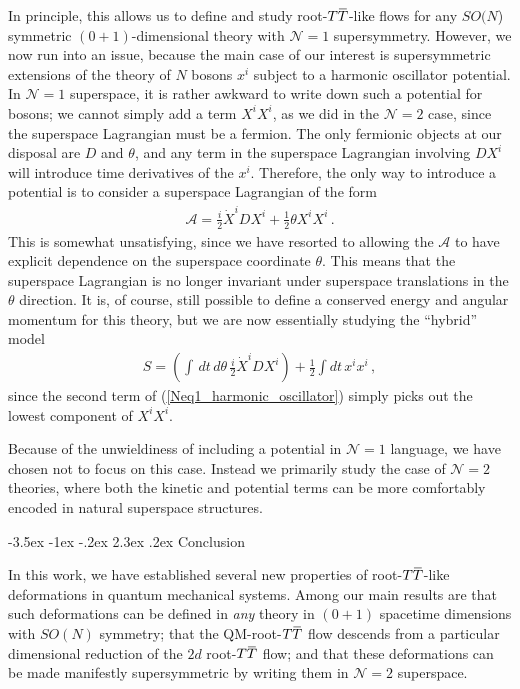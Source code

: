 \documentclass[12pt]{article}
\makeatletter
\numberwithin{equation}{section}
\renewcommand\section{\@startsection {section}{1}{\z@}%
                                   {-3.5ex \@plus -1ex \@minus -.2ex}%
                                   {2.3ex \@plus.2ex}%
                                   {\normalfont\large\bfseries}}
\newcommand{\overbar}[1]{\mkern 1.5mu\overline{\mkern-1.5mu#1\mkern-1.5mu}\mkern 1.5mu}
\def\TT{{T\overbar{T}}}
\makeatother
\begin{document}
In principle, this allows us to define and study root-$\TT$-like flows for any $SO(N$) symmetric $(0+1)$-dimensional theory with $\mathcal{N} = 1$ supersymmetry. However, we now run into an issue, because the main case of our interest is supersymmetric extensions of the theory of $N$ bosons $x^i$ subject to a harmonic oscillator potential. In $\mathcal{N} = 1$ superspace, it is rather awkward to write down such a potential for bosons; we cannot simply add a term $X^i X^i$, as we did in the $\mathcal{N} = 2$ case, since the superspace Lagrangian must be a fermion. The only fermionic objects at our disposal are $D$ and $\theta$, and any term in the superspace Lagrangian involving $D X^i$ will introduce time derivatives of the $x^i$. Therefore, the only way to introduce a potential is to consider a superspace Lagrangian of the form
%
\begin{align}\label{Neq1_harmonic_oscillator}
    \mathcal{A} = \frac{i}{2} \dot{X}^i D X^i + \frac{1}{2} \theta X^i X^i \, .
\end{align}
%
This is somewhat unsatisfying, since we have resorted to allowing the $\mathcal{A}$ to have explicit dependence on the superspace coordinate $\theta$. This means that the superspace Lagrangian is no longer invariant under superspace translations in the $\theta$ direction. It is, of course, still possible to define a conserved energy and angular momentum for this theory, but we are now essentially studying the ``hybrid'' model
%
\begin{align}
    S = \left ( \int \, d t \, d \theta \, \frac{i}{2} \dot{X}^i D X^i  \right) + \frac{1}{2} \int dt \, x^i x^i \, , 
\end{align}
%
since the second term of (\ref{Neq1_harmonic_oscillator}) simply picks out the lowest component of $X^i X^i$.

Because of the unwieldiness of including a potential in $\mathcal{N} = 1$ language, we have chosen not to focus on this case. Instead we primarily study the case of $\mathcal{N} = 2$ theories, where both the kinetic and potential terms can be more comfortably encoded in natural superspace structures.


\section{Conclusion}\label{sec:conclusion}

In this work, we have established several new properties of root-$\TT$-like deformations in quantum mechanical systems. Among our main results are that such deformations can be defined in \emph{any} theory in $(0+1)$ spacetime dimensions with $SO(N)$ symmetry; that the QM-root-$\TT$ flow descends from a particular dimensional reduction of the $2d$ root-$\TT$ flow; and that these deformations can be made manifestly supersymmetric by writing them in $\mathcal{N} = 2$ superspace.
\end{document}
